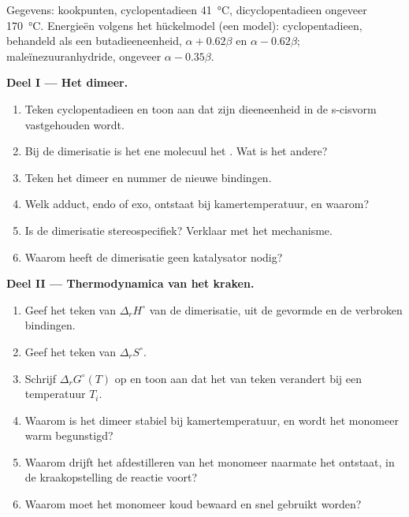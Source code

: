 \begin{problem}
\label{pb:b2:frontier-orbitals:1}
Gegevens: kookpunten, cyclopentadieen \qty{41}{\degreeCelsius}, dicyclopentadieen ongeveer
\qty{170}{\degreeCelsius}. Energieën volgens het hückelmodel (een model): cyclopentadieen, behandeld als
een butadieeneenheid,  $\alpha + 0.62\beta$ en  $\alpha - 0.62\beta$; maleïnezuuranhydride, 
ongeveer $\alpha - 0.35\beta$.

\medskip
\noindent\textbf{Deel I --- Het dimeer.}
\begin{enumerate}
  \item Teken cyclopentadieen en toon aan dat zijn dieeneenheid in de s-cisvorm vastgehouden wordt.
  \item Bij de dimerisatie is het ene molecuul het . Wat is het andere?
  \item Teken het dimeer en nummer de nieuwe bindingen.
  \item Welk adduct, endo of exo, ontstaat bij kamertemperatuur, en waarom?
  \item Is de dimerisatie stereospecifiek? Verklaar met het mechanisme.
  \item Waarom heeft de dimerisatie geen katalysator nodig?
\end{enumerate}

\medskip
\noindent\textbf{Deel II --- Thermodynamica van het kraken.}
\begin{enumerate}[resume]
  \item Geef het teken van $\Delta_r H^\circ$ van de dimerisatie, uit de gevormde en de
        verbroken bindingen.
  \item Geef het teken van $\Delta_r S^\circ$.
  \item Schrijf $\Delta_r G^\circ(T)$ op en toon aan dat het van teken verandert bij een temperatuur $T_i$.
  \item Waarom is het dimeer stabiel bij kamertemperatuur, en wordt het monomeer warm begunstigd?
  \item Waarom drijft het afdestilleren van het monomeer naarmate het ontstaat, in de kraakopstelling de
        reactie voort?
  \item Waarom moet het monomeer koud bewaard en snel gebruikt worden?
\end{enumerate}


\end{problem}
